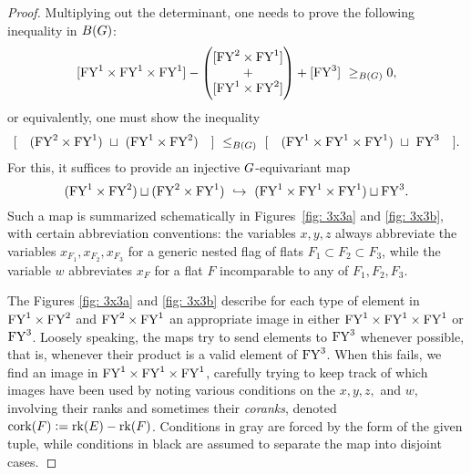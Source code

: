 \begin{proof}
Multiplying out the determinant, one needs to 
prove the following inequality in $B(G)$:
$$
[\FY^1 \times \FY^1 
    \times \FY^1] - \left( \begin{matrix} [\FY^2 \times \FY^1]\\ +\\ [\FY^1 \times \FY^2]\end{matrix} \right)  + [\FY^3] \,\, \geq_{B(\subgroup)} 0,
$$
or equivalently, one must show the inequality
$$
[\quad (\mathrm{FY}^2 \times \mathrm{FY}^1)  \,\, \sqcup \,\, (\mathrm{FY}^1 \times \mathrm{FY}^2)\quad ]
\,\, \leq_{B(G)} \,\, 
[\quad (\mathrm{FY}^1 \times \mathrm{FY}^1 
    \times \mathrm{FY}^1) \,\, \sqcup \,\, \mathrm{FY}^3\quad ].
$$
For this, it suffices to provide an injective $G$-equivariant map 
\[
(\mathrm{FY}^1 \times \mathrm{FY}^2) \sqcup (\mathrm{FY}^2 \times \mathrm{FY}^1)
\,\, \hookrightarrow \,\, 
(\mathrm{FY}^1 \times \mathrm{FY}^1 
    \times \mathrm{FY}^1) \sqcup \mathrm{FY}^3.
\] 
Such a map is summarized schematically in Figures~\ref{fig: 3x3a} and \ref{fig: 3x3b}, with certain abbreviation conventions: the variables $x,y,z$ always abbreviate
the variables $x_{F_1}, x_{F_2},x_{F_3}$ for a generic nested flag of flats $F_1 \subset F_2 \subset F_3$, while the variable $w$ abbreviates $x_F$ for a flat $F$ incomparable to any of $F_1,F_2,F_3$.

The Figures \ref{fig: 3x3a} and \ref{fig: 3x3b} 
describe for each type of element in $\mathrm{FY}^1 \times \mathrm{FY}^2$ and $\mathrm{FY}^2 \times \mathrm{FY}^1$ an appropriate image in either $\mathrm{FY}^1 \times \mathrm{FY}^1 \times \mathrm{FY}^1$ or $\mathrm{FY}^3$.
Loosely speaking, the maps try to send elements to $\mathrm{FY}^3$ whenever possible, that is, whenever their product is a valid element of $\mathrm{FY}^3$. When this fails, we find an image in $\mathrm{FY}^1 \times \mathrm{FY}^1 \times \mathrm{FY}^1$, carefully trying to keep track of which images have been used by noting various conditions on the $x,y,z,$ and $w$, involving their ranks  and sometimes their {\it coranks}, denoted $\operatorname{\mathrm{cork}}(F):=\operatorname{\mathrm{rk}}(E)-\operatorname{\mathrm{rk}}(F)$. Conditions in gray are forced by the form of the given tuple, while conditions in black are assumed to separate the map into disjoint cases.$\qedhere$


\end{proof}

